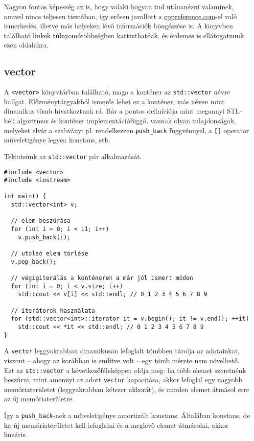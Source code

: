 \documentclass[../cpp_book/cpp_book.tex]{subfiles}
\begin{document}
	\begin{note}
		Nagyon fontos képesség az is, hogy valaki hogyan tud utánanézni valaminek, amivel nincs teljesen tisztában, így erősen javallott a \url{cppreference.com}-el való ismerkedés, illetve más helyeken lévő információk böngészése is. A könyvben található linkek túlnyomótöbbségben kattinthatóak, és érdemes is ellátogatnunk ezen oldalakra.
	\end{note}	
	\subsection{vector}
	A \texttt{<vector>} könyvtárban található, maga a konténer az \texttt{std::vector} névre hallgat. Előzménytárgyakból ismerős lehet ez a konténer, más néven mint dinamikus tömb hivatkoztunk rá. Bár a pontos definíciója mint megannyi STL-béli algoritmus és konténer implementációfüggő, vannak olyan tulajdonságok, melyeket elvár a szabvány: pl. rendelkezzen \texttt{push\_back} függvénnyel, a \texttt{[]} operator műveletigénye legyen konstans, stb.
	
	\medskip
	Tekintsünk az \texttt{std::vector} pár alkalmazását.
	\begin{lstlisting}
#include <vector>
#include <iostream>

int main() {
  std::vector<int> v;

  // elem beszúrása
  for (int i = 0; i < 11; i++)
    v.push_back(i);

  // utolsó elem törlése
  v.pop_back();

  // végigiterálás a konténeren a már jól ismert módon
  for (int i = 0; i < v.size; i++)
    std::cout << v[i] << std::endl; // 0 1 2 3 4 5 6 7 8 9

  // iterátorok használata
  for (std::vector<int>::iterator it = v.begin(); it != v.end(); ++it)
    std::cout << *it << std::endl; // 0 1 2 3 4 5 6 7 8 9
}
	\end{lstlisting}
	A \texttt{vector} leggyakrabban dinamikusan lefoglalt tömbben tárolja az adatainkat, viszont -- ahogy az korábban is említve volt -- egy tömb mérete nem növelhető. Ezt az \texttt{std::vector} a következőféleképpen oldja meg: ha több elemet szeretnénk beszúrni, mint amennyi az adott \texttt{vector} kapacitása, akkor lefoglal egy nagyobb memóriaterületet (leggyakrabban kétszer akkorát), és minden elemet átmásol erre az új memóriaterületre. 
	
	Így a \texttt{push\_back}-nek a műveletigénye amortizált konstans: Általában konstans, de ha új memóriaterületet kell lefoglalni és a meglevő elemet átmásolni, akkor lineáris.
	
\end{document}
